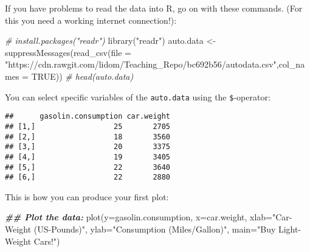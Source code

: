 \documentclass[
]{book}
\newenvironment{Shaded}{\begin{snugshade}}{\end{snugshade}}
\newcommand{\AttributeTok}[1]{\textcolor[rgb]{0.77,0.63,0.00}{#1}}
\newcommand{\CommentTok}[1]{\textcolor[rgb]{0.56,0.35,0.01}{\textit{#1}}}
\newcommand{\ConstantTok}[1]{\textcolor[rgb]{0.00,0.00,0.00}{#1}}
\newcommand{\DocumentationTok}[1]{\textcolor[rgb]{0.56,0.35,0.01}{\textbf{\textit{#1}}}}
\newcommand{\FunctionTok}[1]{\textcolor[rgb]{0.00,0.00,0.00}{#1}}
\newcommand{\NormalTok}[1]{#1}
\newcommand{\OtherTok}[1]{\textcolor[rgb]{0.56,0.35,0.01}{#1}}
\newcommand{\SpecialCharTok}[1]{\textcolor[rgb]{0.00,0.00,0.00}{#1}}
\newcommand{\StringTok}[1]{\textcolor[rgb]{0.31,0.60,0.02}{#1}}
\begin{document}
\hfill\break

If you have problems to read the data into R, go on with these commands. (For this you need a working internet connection!):

\begin{Shaded}
\begin{Highlighting}[]
\CommentTok{\# install.packages("readr")}
\FunctionTok{library}\NormalTok{(}\StringTok{"readr"}\NormalTok{)}
\NormalTok{auto.data }\OtherTok{\textless{}{-}} \FunctionTok{suppressMessages}\NormalTok{(}\FunctionTok{read\_csv}\NormalTok{(}\AttributeTok{file =} \StringTok{"https://cdn.rawgit.com/lidom/Teaching\_Repo/bc692b56/autodata.csv"}\NormalTok{,}\AttributeTok{col\_names =} \ConstantTok{TRUE}\NormalTok{))}
\CommentTok{\# head(auto.data)}
\end{Highlighting}
\end{Shaded}

\hfill\break

You can select specific variables of the \texttt{auto.data} using the \texttt{\$}-operator:

\begin{Shaded}
\end{Shaded}

\begin{verbatim}
##      gasolin.consumption car.weight
## [1,]                  25       2705
## [2,]                  18       3560
## [3,]                  20       3375
## [4,]                  19       3405
## [5,]                  22       3640
## [6,]                  22       2880
\end{verbatim}

\hfill\break

This is how you can produce your first plot:

\begin{Shaded}
\begin{Highlighting}[]
\DocumentationTok{\#\# Plot the data:}
\FunctionTok{plot}\NormalTok{(}\AttributeTok{y=}\NormalTok{gasolin.consumption, }\AttributeTok{x=}\NormalTok{car.weight, }
     \AttributeTok{xlab=}\StringTok{"Car{-}Weight (US{-}Pounds)"}\NormalTok{, }
     \AttributeTok{ylab=}\StringTok{"Consumption (Miles/Gallon)"}\NormalTok{, }
     \AttributeTok{main=}\StringTok{"Buy Light{-}Weight Cars!"}\NormalTok{)}
\end{Highlighting}
\end{Shaded}
\end{document}
